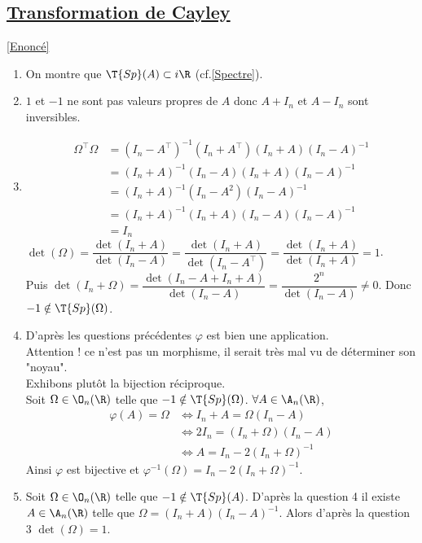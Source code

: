 \documentclass[8pt]{book}
\begin{document}
	\subsection{\underline{Transformation de Cayley} }
	\label{Transformation de Cayley corrigé}
	\textcolor{blue}{\hyperref[Transformation de Cayley]{[Enoncé]}}\\
	\begin{enumerate}[leftmargin=*]
		\item On montre que $\T{Sp}(A)\subset i\R$ (cf.\ref{Spectre}).
		\item $1$ et $-1$ ne sont pas valeurs propres de $A$ donc $A+I_n$ et $A-I_n$ sont inversibles.
		\item \begin{align*}
			\Omega^\top\Omega&=(I_n-A^\top)^{-1}(I_n+A^\top)(I_n+A)(I_n-A)^{-1}\\
			&=(I_n+A)^{-1}(I_n-A)(I_n+A)(I_n-A)^{-1}\\
			&=(I_n+A)^{-1}(I_n-A^2)(I_n-A)^{-1}\\
			&=(I_n+A)^{-1}(I_n+A)(I_n-A)(I_n-A)^{-1}\\
			&=I_n
		\end{align*}
		$\det(\Omega)=\dfrac{\det(I_n+A)}{\det(I_n-A)}=\dfrac{\det(I_n+A)}{\det(I_n-A^\top)}=\dfrac{\det(I_n+A)}{\det(I_n+A)}=1$.\\
		Puis $\det(I_n+\Omega)=\dfrac{\det(I_n-A+I_n+A)}{\det(I_n-A)}=\dfrac{2^n}{\det(I_n-A)}\ne 0$. Donc $-1\notin \T{Sp}(\Omega)$.
		\item D'après les questions précédentes $\varphi$ est bien une application.\\
		Attention ! ce n'est pas un morphisme, il serait très mal vu de déterminer son "noyau".\\
		Exhibons plutôt la bijection réciproque.\\
		Soit $\Omega\in \O_n(\R)$ telle que $-1\notin \T{Sp}(\Omega)$. $\forall A\in \A_n(\R)$,
		\begin{align*}
			\varphi(A)=\Omega&\iff I_n+A=\Omega(I_n-A)\\
			&\iff 2I_n=(I_n+\Omega)(I_n-A)\\
			&\iff A=I_n-2(I_n+\Omega)^{-1}
		\end{align*}
		Ainsi $\varphi$ est bijective et $\varphi^{-1}(\Omega)=I_n-2(I_n+\Omega)^{-1}$.
		\item Soit $\Omega\in \O_n(\R)$ telle que $-1\notin\T{Sp}(A)$. D'après la question 4 il existe $A\in \A_n(\R)$ telle que $\Omega=(I_n+A)(I_n-A)^{-1}$. Alors d'après la question 3 $\det(\Omega)=1$.\\

\end{enumerate}
\end{document}
